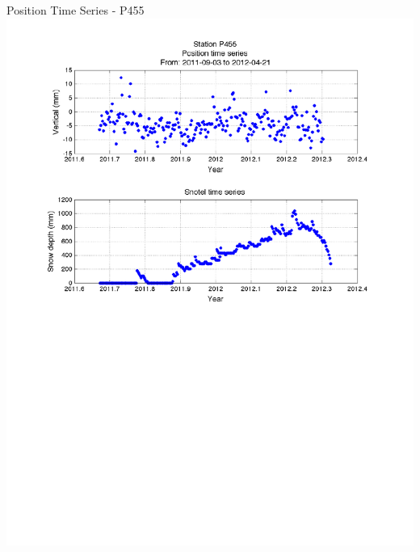 \documentclass{beamer}
\begin{document}
\begin{frame}{Position Time Series - P455}
  \includegraphics[width=1\linewidth,trim=50 0 50 20, clip=true]{logan/p455_snotel.pdf}
\end{frame}
\end{document}
